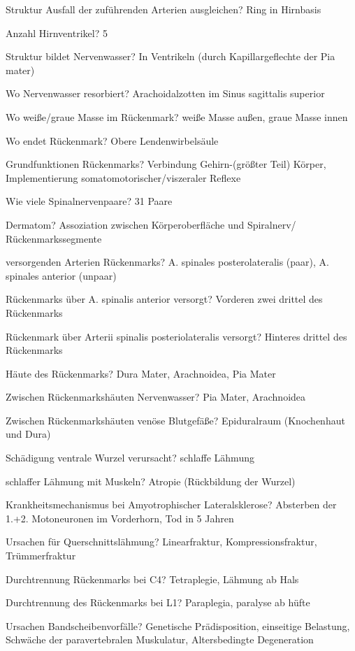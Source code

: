 \documentclass[a4paper]{article}
\begin{document}
\begin{multicols}{3}
  Struktur Ausfall der zuführenden Arterien ausgleichen? Ring in Hirnbasis

  Anzahl Hirnventrikel? 5

  Struktur bildet Nervenwasser? In Ventrikeln (durch Kapillargeflechte der Pia mater)

  Wo Nervenwasser resorbiert? Arachoidalzotten im Sinus sagittalis superior

  Wo weiße/graue Masse im Rückenmark? weiße Masse außen, graue Masse innen

  Wo endet Rückenmark? Obere Lendenwirbelsäule

  Grundfunktionen Rückenmarks? Verbindung Gehirn-(größter Teil) Körper, Implementierung somatomotorischer/viszeraler Reflexe

  Wie viele Spinalnervenpaare? 31 Paare

  Dermatom? Assoziation zwischen Körperoberfläche und Spiralnerv/ Rückenmarkssegmente

  versorgenden Arterien Rückenmarks? A. spinales posterolateralis (paar), A. spinales anterior (unpaar)

  Rückenmarks über A. spinalis anterior versorgt? Vorderen zwei drittel des Rückenmarks

  Rückenmark über Arterii spinalis posteriolateralis versorgt? Hinteres drittel des Rückenmarks

  Häute des Rückenmarks? Dura Mater, Arachnoidea, Pia Mater

  Zwischen Rückenmarkshäuten Nervenwasser? Pia Mater, Arachnoidea

  Zwischen Rückenmarkshäuten venöse Blutgefäße? Epiduralraum (Knochenhaut und Dura)

  Schädigung ventrale Wurzel verursacht? schlaffe Lähmung

  schlaffer Lähmung mit Muskeln? Atropie (Rückbildung der Wurzel)

  Krankheitsmechanismus bei Amyotrophischer Lateralsklerose? Absterben der 1.+2. Motoneuronen im Vorderhorn, Tod in 5 Jahren

  Ursachen für Querschnittslähmung? Linearfraktur, Kompressionsfraktur, Trümmerfraktur

  Durchtrennung Rückenmarks bei C4? Tetraplegie, Lähmung ab Hals

  Durchtrennung des Rückenmarks bei L1? Paraplegia, paralyse ab hüfte

  Ursachen Bandscheibenvorfälle? Genetische Prädisposition, einseitige Belastung, Schwäche der paravertebralen Muskulatur, Altersbedingte Degeneration


\end{multicols}
\end{document}
